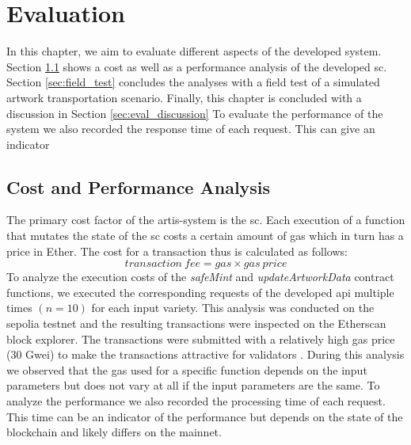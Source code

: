 \chapter{Evaluation}
\label{chap:evaluation}
In this chapter, we aim to evaluate different aspects of the developed system. Section \ref{sec:cost_and_performance} shows a cost as well as a performance analysis of the developed \gls{sc}. Section \ref{sec:field_test} concludes the analyses with a field test of a simulated artwork transportation scenario. Finally, this chapter is concluded with a discussion in Section \ref{sec:eval_discussion} To evaluate the performance of the system we also recorded the response time of each request. This can give an indicator

\section{Cost and Performance Analysis}
\label{sec:cost_and_performance}
The primary cost factor of the artis-system is the \gls{sc}. Each execution of a function that mutates the state of the \gls{sc} costs a certain amount of gas which in turn has a price in Ether. The cost for a transaction thus is calculated as follows:
$$
transaction\ fee = gas \times gas\ price
$$
To analyze the execution costs of the \textit{safeMint} and \textit{updateArtworkData} contract functions, we executed the corresponding requests of the developed \gls{api} multiple times $(n = 10)$ for each input variety. This analysis was conducted on the sepolia testnet and the resulting transactions were inspected on the Etherscan block explorer. The transactions were submitted with a relatively high gas price (30 Gwei) to make the transactions attractive for validators \cite{ethergas}. During this analysis we observed that the gas used for a specific function depends on the input parameters but does not vary at all if the input parameters are the same. To analyze the performance we also recorded the processing time of each request. This time can be an indicator of the performance but depends on the state of the blockchain and likely differs on the mainnet.

